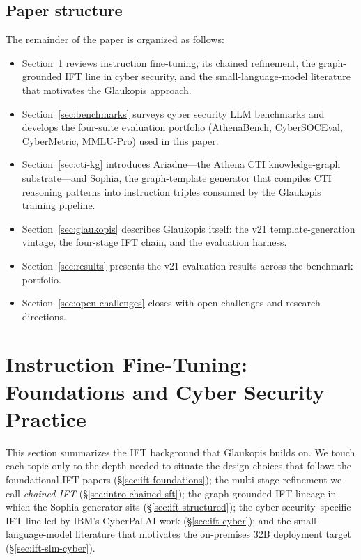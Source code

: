 \documentclass[conference]{IEEEtran}
\begin{document}
\subsection{Paper structure}
\label{sec:intro-paper-structure}
The remainder of the paper is organized as follows:
\begin{itemize}
  \item Section~\ref{sec:ift-slm} reviews instruction fine-tuning, its chained refinement, the graph-grounded IFT line in cyber security, and the small-language-model literature that motivates the Glaukopis approach.
  \item Section~\ref{sec:benchmarks} surveys cyber security LLM benchmarks and develops the four-suite evaluation portfolio (AthenaBench, CyberSOCEval, CyberMetric, MMLU-Pro) used in this paper.
  \item Section~\ref{sec:cti-kg} introduces Ariadne---the Athena CTI knowledge-graph substrate---and Sophia, the graph-template generator that compiles CTI reasoning patterns into instruction triples consumed by the Glaukopis training pipeline.
  \item Section~\ref{sec:glaukopis} describes Glaukopis itself: the v21 template-generation vintage, the four-stage IFT chain, and the evaluation harness.
  \item Section~\ref{sec:results} presents the v21 evaluation results across the benchmark portfolio.
  \item Section~\ref{sec:open-challenges} closes with open challenges and research directions.
\end{itemize}

\section{Instruction Fine-Tuning: Foundations and Cyber Security Practice}
\label{sec:ift-slm}

This section summarizes the IFT background that Glaukopis builds on. We touch each topic only to the depth needed to situate the design choices that follow: the foundational IFT papers (\S\ref{sec:ift-foundations}); the multi-stage refinement we call \emph{chained IFT} (\S\ref{sec:intro-chained-sft}); the graph-grounded IFT lineage in which the Sophia generator sits (\S\ref{sec:ift-structured}); the cyber-security--specific IFT line led by IBM's CyberPal.AI work (\S\ref{sec:ift-cyber}); and the small-language-model literature that motivates the on-premises 32B deployment target (\S\ref{sec:ift-slm-cyber}).
\end{document}
